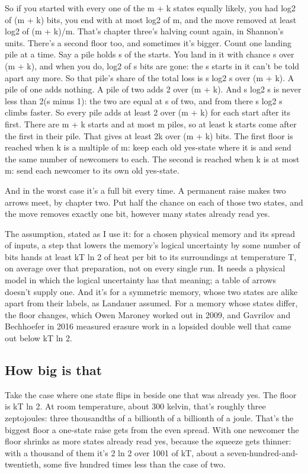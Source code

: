 \documentclass[11pt,twoside]{article}
\theoremstyle{thielethm}
\theoremstyle{thieledef}
\theoremstyle{thieledef}
\theoremstyle{thieledef}
\theoremstyle{thielethm}
\theoremstyle{thieleobs}
\theoremstyle{thielethm}
\begin{document}
So if you started with every one of the m + k states equally likely, you had log2 of (m + k) bits, you end with at most log2 of m, and the move removed at least log2 of (m + k)/m. That's chapter three's halving count again, in Shannon's units. There's a second floor too, and sometimes it's bigger. Count one landing pile at a time. Say a pile holds s of the starts. You land in it with chance s over (m + k), and when you do, log2 of s bits are gone: the s starts in it can't be told apart any more. So that pile's share of the total loss is s log2 s over (m + k). A pile of one adds nothing. A pile of two adds 2 over (m + k). And s log2 s is never less than 2(s minus 1): the two are equal at s of two, and from there s log2 s climbs faster. So every pile adds at least 2 over (m + k) for each start after its first. There are m + k starts and at most m piles, so at least k starts come after the first in their pile. That gives at least 2k over (m + k) bits. The first floor is reached when k is a multiple of m: keep each old yes-state where it is and send the same number of newcomers to each. The second is reached when k is at most m: send each newcomer to its own old yes-state.

And in the worst case it's a full bit every time. A permanent raise makes two arrows meet, by chapter two. Put half the chance on each of those two states, and the move removes exactly one bit, however many states already read yes.

The assumption, stated as I use it: for a chosen physical memory and its spread of inputs, a step that lowers the memory's logical uncertainty by some number of bits hands at least kT ln 2 of heat per bit to its surroundings at temperature T, on average over that preparation, not on every single run. It needs a physical model in which the logical uncertainty has that meaning; a table of arrows doesn't supply one. And it's for a symmetric memory, whose two states are alike apart from their labels, as Landauer assumed. For a memory whose states differ, the floor changes, which Owen Maroney worked out in 2009, and Gavrilov and Bechhoefer in 2016 measured erasure work in a lopsided double well that came out below kT ln 2.

\subsection{How big is that}

Take the case where one state flips in beside one that was already yes. The floor is kT ln 2. At room temperature, about 300 kelvin, that's roughly three zeptojoules: three thousandths of a billionth of a billionth of a joule. That's the biggest floor a one-state raise gets from the even spread. With one newcomer the floor shrinks as more states already read yes, because the squeeze gets thinner: with a thousand of them it's 2 ln 2 over 1001 of kT, about a seven-hundred-and-twentieth, some five hundred times less than the case of two.
\end{document}

